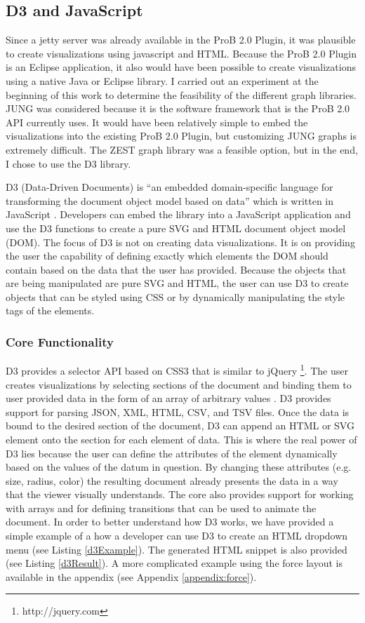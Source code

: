 \subsection{D3 and JavaScript}

Since a jetty server was already available in the ProB 2.0 Plugin, it was plausible to create visualizations using javascript and HTML. Because the ProB 2.0 Plugin is an Eclipse application, it also would have been possible to create visualizations using a native Java or Eclipse library. I carried out an experiment at the beginning of this work to determine the feasibility of the different graph libraries. JUNG was considered because it is the software framework that is the ProB 2.0 API currently uses. It would have been relatively simple to embed the visualizations into the existing ProB 2.0 Plugin, but customizing JUNG graphs is extremely difficult. The ZEST graph library was a feasible option, but in the end, I chose to use the D3 library. 

D3 (Data-Driven Documents) is ``an embedded domain-specific language for transforming
the document object model based on data'' which is written in JavaScript \cite{2011-d3}. Developers can embed the library into a JavaScript application and use the D3 functions to create a pure SVG and HTML document object model (DOM). The focus of D3 is not on creating data visualizations. It is on providing the user the capability of defining exactly which elements the DOM should contain based on the data that the user has provided. Because the objects that are being manipulated are pure SVG and HTML, the user can use D3 to create objects that can be styled using CSS or by dynamically manipulating the style tags of the elements.

\subsubsection{Core Functionality}

D3 provides a selector API based on CSS3 that is similar to jQuery \footnote{http://jquery.com}. The user creates visualizations by selecting sections of the document and binding them to user provided data in the form of an array of arbitrary values \cite{2011-d3}. D3 provides support for parsing JSON, XML, HTML, CSV, and TSV files. Once the data is bound to the desired section of the document, D3 can append an HTML or SVG element onto the section for each element of data. This is where the real power of D3 lies because the user can define the attributes of the element dynamically based on the values of the datum in question. By changing these attributes (e.g. size, radius, color) the resulting document already presents the data in a way that the viewer visually understands. The core also provides support for working with arrays and for defining transitions that can be used to animate the document. In order to better understand how D3 works, we have provided a simple example of a how a developer can use D3 to create an HTML dropdown menu (see Listing \ref{d3Example}). The generated HTML snippet is also provided (see Listing \ref{d3Result}). A more complicated example using the force layout is available in the appendix (see Appendix \ref{appendix:force}).


